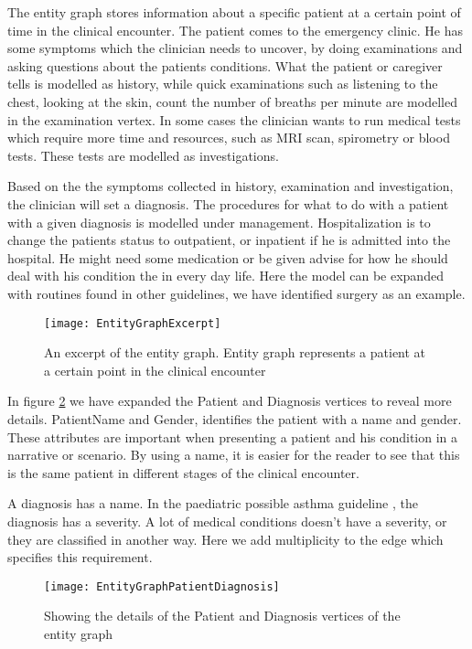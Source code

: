 The entity graph stores information about a specific patient at a certain point of time in the clinical encounter. The patient comes to the emergency clinic. He has some symptoms which the clinician needs to uncover, by doing examinations and asking questions about the patients conditions. What the patient or caregiver tells is modelled as history, while quick examinations such as listening to the chest, looking at the skin, count the number of breaths per minute are modelled in the examination vertex. In some cases the clinician wants to run medical tests which require more time and resources, such as MRI scan, spirometry or blood tests. These tests are modelled as investigations.

Based on the the symptoms collected in history, examination and investigation, the clinician will set a diagnosis. The procedures for what to do with a patient with a given diagnosis is modelled under management. Hospitalization is to change the patients status to outpatient, or inpatient if he is admitted into the hospital. He might need some medication or be given advise for how he should deal with his condition the in every day life. Here the model can be expanded with routines found in other guidelines, we have identified surgery as an example. 

\begin{figure}[h!]
	\texttt{[image: EntityGraphExcerpt]}
	\caption {An excerpt of the entity graph. Entity graph represents a patient at a certain point in the clinical encounter}
	\label{fig:EntityGraphExcerpt}
\end{figure}

In figure \ref{fig:EntityGraphPatientDiagnosis} we have expanded the Patient and Diagnosis vertices to reveal more details. PatientName and Gender, identifies the patient with a name and gender. These attributes are important when presenting a patient and his condition in a narrative or scenario. By using a name, it is easier for the reader to see that this is the same patient in different stages of the clinical encounter.

A diagnosis has a name. In the paediatric possible asthma guideline \parencite{RepublicofKeny2016}, the diagnosis has a severity. A lot of medical conditions doesn't have a severity, or they are classified in another way. Here we add multiplicity to the edge which specifies this requirement. 

\begin{figure}[h!]
	\texttt{[image: EntityGraphPatientDiagnosis]}
	\caption {Showing the details of the Patient and Diagnosis vertices of the entity graph}
	\label{fig:EntityGraphPatientDiagnosis}
\end{figure}

